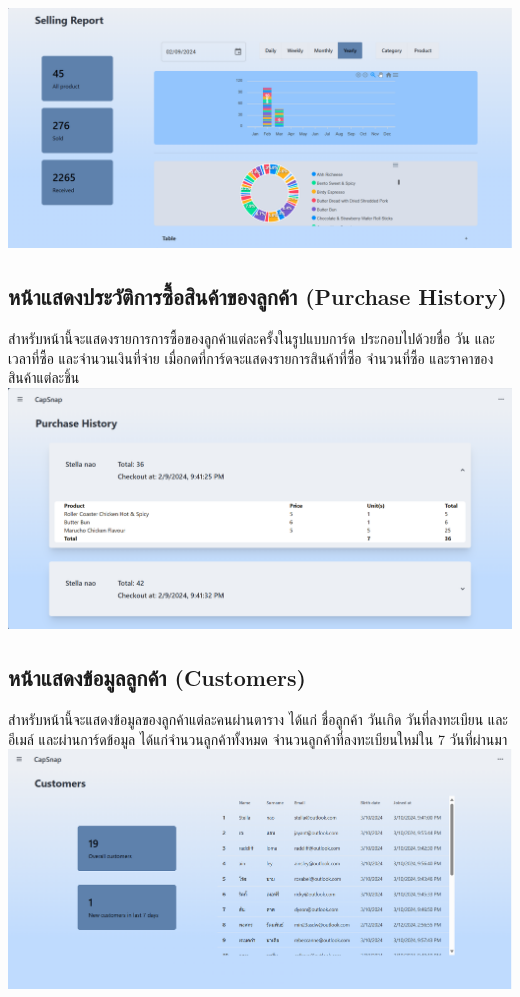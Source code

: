 {
\includegraphics[scale=0.35]{pic/ui/w22.png}
}\\
\subsection{หน้าแสดงประวัติการซื้อสินค้าของลูกค้า (Purchase History)}
สำหรับหน้านี้จะแสดงรายการการซื้อของลูกค้าแต่ละครั้งในรูปแบบการ์ด ประกอบไปด้วยชื่อ วัน และเวลาที่ซื้อ และจำนวนเงินที่จ่าย เมื่อกดที่การ์ดจะแสดงรายการสินค้าที่ซื้อ จำนวนที่ซื้อ และราคาของสินค้าแต่ละชิ้น\\
{
\includegraphics[scale=0.35]{pic/ui/w23.png}
}\\
\subsection{หน้าแสดงข้อมูลลูกค้า (Customers)}
สำหรับหน้านี้จะแสดงข้อมูลของลูกค้าแต่ละคนผ่านตาราง ได้แก่ ชื่อลูกค้า วันเกิด วันที่ลงทะเบียน และอีเมล์ และผ่านการ์ดข้อมูล ได้แก่จำนวนลูกค้าทั้งหมด จำนวนลูกค้าที่ลงทะเบียนใหม่ใน 7 วันที่ผ่านมา\\
{
\includegraphics[scale=0.35]{pic/ui/w24.png}
}\\


